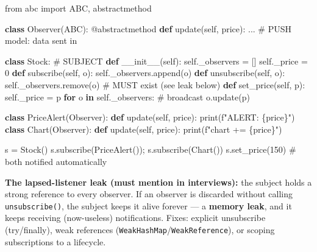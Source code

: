 \documentclass[11pt]{article}
\newenvironment{Shaded}{\begin{snugshade}}{\end{snugshade}}
\newcommand{\AttributeTok}[1]{\textcolor[rgb]{0.16,0.50,0.73}{#1}}
\newcommand{\BuiltInTok}[1]{\textcolor[rgb]{0.50,0.55,0.55}{#1}}
\newcommand{\CommentTok}[1]{\textcolor[rgb]{0.48,0.49,0.49}{#1}}
\newcommand{\ControlFlowTok}[1]{\textcolor[rgb]{0.99,0.74,0.29}{\textbf{#1}}}
\newcommand{\DecValTok}[1]{\textcolor[rgb]{0.96,0.45,0.00}{#1}}
\newcommand{\FunctionTok}[1]{\textcolor[rgb]{0.56,0.27,0.68}{#1}}
\newcommand{\ImportTok}[1]{\textcolor[rgb]{0.15,0.68,0.38}{#1}}
\newcommand{\KeywordTok}[1]{\textcolor[rgb]{0.81,0.81,0.76}{\textbf{#1}}}
\newcommand{\NormalTok}[1]{\textcolor[rgb]{0.81,0.81,0.76}{#1}}
\newcommand{\OperatorTok}[1]{\textcolor[rgb]{0.81,0.81,0.76}{#1}}
\newcommand{\SpecialCharTok}[1]{\textcolor[rgb]{0.24,0.68,0.91}{#1}}
\newcommand{\SpecialStringTok}[1]{\textcolor[rgb]{0.85,0.27,0.33}{#1}}
\newcommand{\VariableTok}[1]{\textcolor[rgb]{0.15,0.68,0.68}{#1}}
\begin{document}
\begin{Shaded}
\begin{Highlighting}[]
\ImportTok{from}\NormalTok{ abc }\ImportTok{import}\NormalTok{ ABC, abstractmethod}

\KeywordTok{class}\NormalTok{ Observer(ABC):}
    \AttributeTok{@abstractmethod}
    \KeywordTok{def}\NormalTok{ update(}\VariableTok{self}\NormalTok{, price): ...                 }\CommentTok{\# PUSH model: data sent in}

\KeywordTok{class}\NormalTok{ Stock:                                      }\CommentTok{\# SUBJECT}
    \KeywordTok{def} \FunctionTok{\_\_init\_\_}\NormalTok{(}\VariableTok{self}\NormalTok{):}
        \VariableTok{self}\NormalTok{.\_observers }\OperatorTok{=}\NormalTok{ []}
        \VariableTok{self}\NormalTok{.\_price }\OperatorTok{=} \DecValTok{0}
    \KeywordTok{def}\NormalTok{ subscribe(}\VariableTok{self}\NormalTok{, o): }\VariableTok{self}\NormalTok{.\_observers.append(o)}
    \KeywordTok{def}\NormalTok{ unsubscribe(}\VariableTok{self}\NormalTok{, o): }\VariableTok{self}\NormalTok{.\_observers.remove(o)   }\CommentTok{\# MUST exist (see leak below)}
    \KeywordTok{def}\NormalTok{ set\_price(}\VariableTok{self}\NormalTok{, p):}
        \VariableTok{self}\NormalTok{.\_price }\OperatorTok{=}\NormalTok{ p}
        \ControlFlowTok{for}\NormalTok{ o }\KeywordTok{in} \VariableTok{self}\NormalTok{.\_observers:                 }\CommentTok{\# broadcast}
\NormalTok{            o.update(p)}

\KeywordTok{class}\NormalTok{ PriceAlert(Observer):}
    \KeywordTok{def}\NormalTok{ update(}\VariableTok{self}\NormalTok{, price): }\BuiltInTok{print}\NormalTok{(}\SpecialStringTok{f"ALERT: }\SpecialCharTok{\{}\NormalTok{price}\SpecialCharTok{\}}\SpecialStringTok{"}\NormalTok{)}
\KeywordTok{class}\NormalTok{ Chart(Observer):}
    \KeywordTok{def}\NormalTok{ update(}\VariableTok{self}\NormalTok{, price): }\BuiltInTok{print}\NormalTok{(}\SpecialStringTok{f"chart += }\SpecialCharTok{\{}\NormalTok{price}\SpecialCharTok{\}}\SpecialStringTok{"}\NormalTok{)}

\NormalTok{s }\OperatorTok{=}\NormalTok{ Stock()}
\NormalTok{s.subscribe(PriceAlert())}\OperatorTok{;}\NormalTok{ s.subscribe(Chart())}
\NormalTok{s.set\_price(}\DecValTok{150}\NormalTok{)   }\CommentTok{\# both notified automatically}
\end{Highlighting}
\end{Shaded}

\textbf{The lapsed-listener leak (must mention in interviews):} the subject holds a strong reference to every observer. If an observer is discarded without calling \texttt{unsubscribe()}, the subject keeps it alive forever --- a \textbf{memory leak}, and it keeps receiving (now-useless) notifications. Fixes: explicit unsubscribe (try/finally), weak references (\texttt{WeakHashMap}/\texttt{WeakReference}), or scoping subscriptions to a lifecycle.
\end{document}
